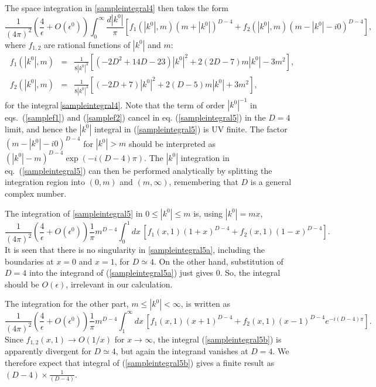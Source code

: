 \documentclass[preprint,amsmath,amssymb,superscriptaddress, floatfix,nofootinbib]{revtex4}
\begin{document}
The space integration in \eqref{sampleintegral4} then takes the form 
\begin{equation}
\frac{1}{(4\pi)^2}\left( \frac{4}{\epsilon}+O(\epsilon^0) \right) 
\int_{0}^{\infty} \frac{d |k^0|}{\pi} 
\left[ f_1(|k^0|, m)(m+|k^0|)^{D-4} + f_2(|k^0|, m)(m-|k^0|-i0)^{D-4} \right] , 
\label{sampleintegral5}
\end{equation}
where $f_{1,2}$ are rational functions of $|k^0|$ and $m$:
\begin{eqnarray}
f_1(|k^0|, m)&=& 
\frac{1}{8|k^0|^3} 
\left[ (-2D^2+14D-23) |k^0|^2 
+ 2(2D-7)m|k^0| -3m^2 \right] ,
\label{samplef1}
\\
f_2(|k^0|, m)&=&
\frac{1}{8|k^0|^3}
\left[ (-2D+7)|k^0|^2 +2(D-5)m|k^0| 
+3m^2 \right] ,
\label{samplef2}
\end{eqnarray}
for the integral\,\eqref{sampleintegral4}.
Note that the term of order $|k^0|^{-1}$ 
in eqs.~(\ref{samplef1}) and (\ref{samplef2}) cancel 
in eq. (\ref{sampleintegral5}) in the $D=4$ limit, 
and hence the $|k^0|$ integral in (\ref{sampleintegral5}) 
is UV finite. 
The factor $(m-|k^0|-i0)^{D-4}$ for  $|k^0|>m$ should be interpreted as 
$(|k^0|-m)^{D-4}\exp(-i(D-4)\pi)$.  
The $|k^0|$ integration in eq.~(\ref{sampleintegral5}) can then be performed 
analytically by 
splitting the integration region into $(0, m)$ and $(m, \infty)$, 
remembering that $D$ is a general complex number. 

The integration of \eqref{sampleintegral5} 
in $0\le |k^0| \le m$ is, using $|k^0|=mx$, 
\begin{equation}
\frac{1}{(4\pi)^2}\left( \frac{4}{\epsilon}+O(\epsilon^0) \right) \frac{1}{\pi} m^{D-4} 
\int_{0}^{1} dx \, 
\left[ f_1(x, 1)(1+x)^{D-4} + f_2(x, 1)(1-x)^{D-4} \right]  . 
\label{sampleintegral5a}
\end{equation}
It is seen that there is no singularity 
in \eqref{sampleintegral5a},  
including the boundaries at $x=0$ and $x=1$, 
for $D\simeq 4$.  
On the other hand, substitution of $D=4$ into the integrand of 
(\ref{sampleintegral5a}) just gives 0. So, the integral should be $O(\epsilon)$, 
irrelevant in our calculation.  

The integration for the other part,  $m\le |k^0|<\infty$, is written as 
\begin{equation}
\frac{1}{(4\pi)^2}\left( \frac{4}{\epsilon}+O(\epsilon^0) \right) \frac{1}{\pi} m^{D-4} 
\int_{1}^{\infty} dx \, 
\left[ f_1(x, 1)(x+1)^{D-4} + f_2(x, 1)(x-1)^{D-4} e^{-i(D-4) \pi} \right] .
\label{sampleintegral5b}
\end{equation}
Since $f_{1,2}(x,1)\to O(1/x)$ for $x\to\infty$, the integral (\ref{sampleintegral5b}) is 
apparently divergent for $D\simeq 4$, but again the integrand vanishes at $D=4$. 
We therefore expect that integral of (\ref{sampleintegral5b})  gives 
a finite result as $(D-4)\times\frac{1}{(D-4)}$. 
\end{document}
